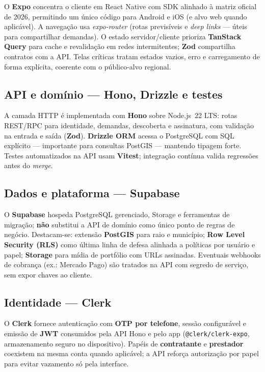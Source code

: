 \documentclass[12pt, a4paper]{article}
\begin{document}
O \textbf{Expo} \cite{react2024} concentra o cliente em React Native com
SDK alinhado à matriz oficial de 2026, permitindo um único código para
Android e iOS (e alvo web quando aplicável). A navegação usa
\textit{expo-router} (rotas previsíveis e \textit{deep links} --- úteis
para compartilhar demandas). O estado servidor/cliente prioriza
\textbf{TanStack Query} para cache e revalidação em redes intermitentes;
\textbf{Zod} compartilha contratos com a API. Telas críticas tratam
estados vazios, erro e carregamento de forma explícita, coerente com o
público-alvo regional.

\subsection{API e domínio --- Hono, Drizzle e testes}

A camada HTTP é implementada com \textbf{Hono} sobre Node.js~22 LTS:
rotas REST/RPC para identidade, demandas, descoberta e assinatura, com
validação na entrada e saída (\textbf{Zod}). \textbf{Drizzle ORM}
acessa o PostgreSQL com SQL explícito --- importante para consultas
PostGIS --- mantendo tipagem forte. Testes automatizados na API usam
\textbf{Vitest}; integração contínua valida regressões antes do
\textit{merge}.

\subsection{Dados e plataforma --- Supabase}

O \textbf{Supabase} \cite{supabase2024} hospeda PostgreSQL gerenciado,
Storage e ferramentas de migração; \textbf{não} substitui a API de
domínio como único ponto de regras de negócio. Destacam-se: extensão
\textbf{PostGIS} para raio e município; \textbf{Row Level Security (RLS)}
como última linha de defesa alinhada a políticas por usuário e papel;
\textbf{Storage} para mídia de portfólio com URLs assinadas. Eventuais
webhooks de cobrança (ex.: Mercado Pago) são tratados na API com
segredo de serviço, sem expor chaves ao cliente.

\subsection{Identidade --- Clerk}

O \textbf{Clerk} fornece autenticação com \textbf{OTP por telefone},
sessão configurável e emissão de \textbf{JWT} consumidos pela API Hono e
pelo app (\texttt{@clerk/clerk-expo}, armazenamento seguro no
dispositivo). Papéis de \textbf{contratante} e \textbf{prestador}
coexistem na mesma conta quando aplicável; a API reforça autorização por
papel para evitar vazamento só pela interface.
\end{document}
